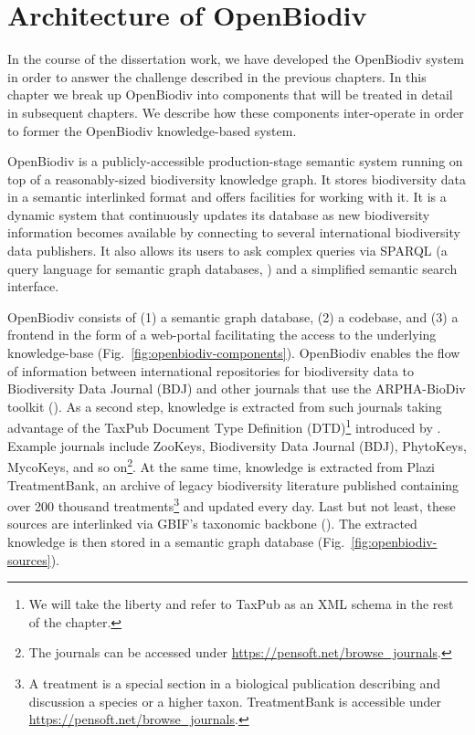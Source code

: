 \chapter{Architecture of OpenBiodiv}
\label{chapter-openbiodiv}

In the course of the dissertation work, we have developed the OpenBiodiv system in order to answer the challenge described in the previous chapters. In this chapter we break up OpenBiodiv into components that will be treated in detail in subsequent chapters. We describe how these components inter-operate in order to former the OpenBiodiv knowledge-based system.

OpenBiodiv is a publicly-accessible production-stage semantic system running on top of a reasonably-sized biodiversity knowledge graph. It stores biodiversity data in a semantic interlinked format and offers facilities for working with it. It is a dynamic system that continuously updates its database as new biodiversity information becomes available by connecting to several international biodiversity data publishers. It also allows its users to ask complex queries via SPARQL (a query language for semantic graph databases, \cite{the_w3c_sparql_working_group_sparql_2013}) and a simplified semantic search interface.

OpenBiodiv consists of (1) a semantic graph database, (2) a codebase, and (3) a frontend in the form of a web-portal facilitating the access to the underlying knowledge-base (Fig.~\ref{fig:openbiodiv-components}). OpenBiodiv enables the flow of information between international repositories for biodiversity data to Biodiversity Data Journal (BDJ) and other journals that use the ARPHA-BioDiv toolkit (\cite{penev_arpha-biodiv:_2017}). As a second step, knowledge is extracted from such journals taking advantage of the TaxPub Document Type Definition (DTD)\footnote{We will take the liberty and refer to TaxPub as an XML schema in the rest of the chapter.} introduced by \cite{catapano_taxpub:_2010}. Example journals include ZooKeys, Biodiversity Data Journal (BDJ), PhytoKeys, MycoKeys, and so on\footnote{The journals can be accessed under \url{https://pensoft.net/browse_journals}.}. At the same time, knowledge is extracted from Plazi TreatmentBank, an archive of legacy biodiversity literature published containing over 200 thousand treatments\footnote{A treatment is a special section in a biological publication describing and discussion a species or a higher taxon. TreatmentBank is accessible under \url{https://pensoft.net/browse_journals}.} and updated every day. Last but not least, these sources are interlinked via GBIF's taxonomic backbone (\cite{gbif_secretariat_gbif_2017}). The extracted knowledge is then stored in a semantic graph database (Fig.~\ref{fig:openbiodiv-sources}).

